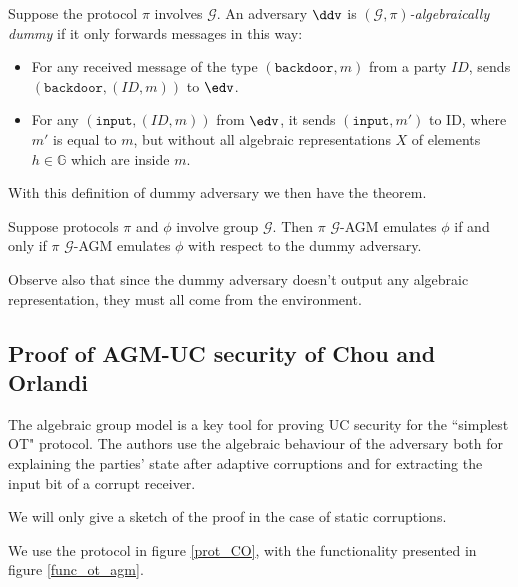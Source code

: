 \begin{definition}
    Suppose the protocol $\pi$ involves $\mathcal G$. An adversary $\ddv$ is \emph{$(\mathcal G, \pi)$-algebraically dummy} if it only forwards messages in this way:
    \begin{itemize}
        \item For any received message of the type $(\texttt{backdoor},m)$ from a party $ID$, sends $(\texttt{backdoor},(ID, m))$ to $\edv$.
        \item For any $(\texttt{input},(ID, m))$ from $\edv$, it sends $(\texttt{input}, m')$ to ID, where $m'$ is equal to $m$, but without all algebraic representations $X$ of elements $h\in\mathbb G$ which are inside $m$.
    \end{itemize}
\end{definition}

With this definition of dummy adversary we then have the theorem.

\begin{theorem}
    Suppose protocols $\pi$ and $\phi$ involve group $\mathcal G$. Then $\pi$ $\mathcal G$-AGM emulates $\phi$ if and only if $\pi$ $\mathcal G$-AGM emulates $\phi$ with respect to the dummy adversary.
\end{theorem}

Observe also that since the dummy adversary doesn't output any algebraic representation, they must all come from the environment.

\subsection{Proof of AGM-UC security of Chou and Orlandi}

The algebraic group model is a key tool for proving UC security for the ``simplest OT" protocol. The authors use the algebraic behaviour of the adversary both for explaining the parties' state after adaptive corruptions and for extracting the input bit of a corrupt receiver.

We will only give a sketch of the proof in the case of static corruptions.

We use the protocol in figure \ref{prot_CO}, with the functionality presented in figure \ref{func_ot_agm}.

